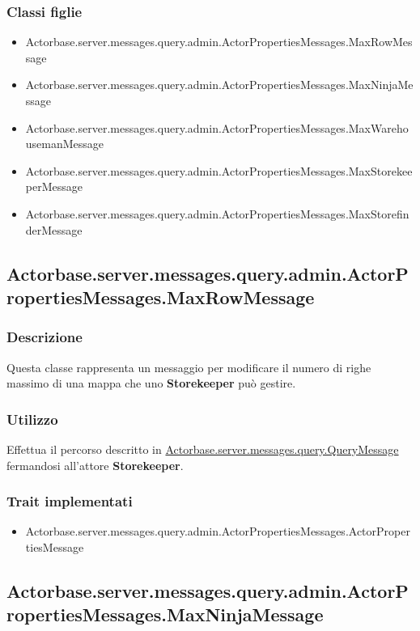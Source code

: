 \documentclass[a4paper]{article}
\begin{document}
			\subsubsection{Classi figlie}
				\begin{itemize}
					\item Actorbase.server.messages.query.admin.ActorPropertiesMessages.MaxRowMessage
					\item Actorbase.server.messages.query.admin.ActorPropertiesMessages.MaxNinjaMessage
					\item Actorbase.server.messages.query.admin.ActorPropertiesMessages.MaxWarehousemanMessage
					\item Actorbase.server.messages.query.admin.ActorPropertiesMessages.MaxStorekeeperMessage
					\item Actorbase.server.messages.query.admin.ActorPropertiesMessages.MaxStorefinderMessage
				\end{itemize}

		\subsection{Actorbase.server.messages.query.admin.ActorPropertiesMessages.MaxRowMessage}
		
			\subsubsection{Descrizione}
				Questa classe rappresenta un messaggio per modificare il numero di righe massimo di una mappa che uno \textbf{Storekeeper} può gestire.
				
			\subsubsection{Utilizzo}
				Effettua il percorso descritto in \hyperref[QueryMessage]{Actorbase.server.messages.query.QueryMessage} fermandosi all'attore 
				\textbf{Storekeeper}.
				
			\subsubsection{Trait implementati}
				\begin{itemize}
					\item Actorbase.server.messages.query.admin.ActorPropertiesMessages.ActorPropertiesMessage
				\end{itemize}
		
		\subsection{Actorbase.server.messages.query.admin.ActorPropertiesMessages.MaxNinjaMessage}
\end{document}
